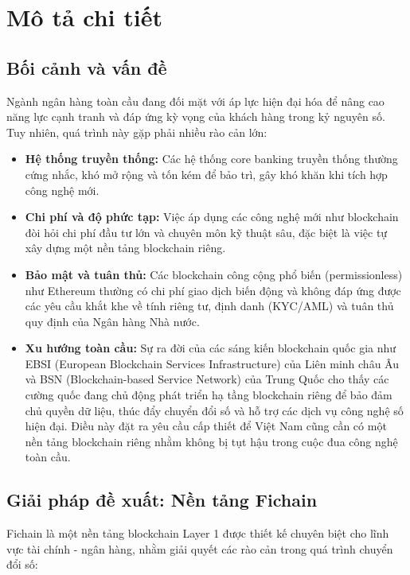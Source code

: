 \section{Mô tả chi tiết}

\subsection{Bối cảnh và vấn đề}
Ngành ngân hàng toàn cầu đang đối mặt với áp lực hiện đại hóa để nâng cao năng lực cạnh tranh và đáp ứng kỳ vọng của khách hàng trong kỷ nguyên số. Tuy nhiên, quá trình này gặp phải nhiều rào cản lớn:
\begin{itemize}
  \item \textbf{Hệ thống truyền thống:} Các hệ thống core banking truyền thống thường cứng nhắc, khó mở rộng và tốn kém để bảo trì, gây khó khăn khi tích hợp công nghệ mới.\cite{haralayya2021core}
  \item \textbf{Chi phí và độ phức tạp:} Việc áp dụng các công nghệ mới như blockchain đòi hỏi chi phí đầu tư lớn và chuyên môn kỹ thuật sâu, đặc biệt là việc tự xây dựng một nền tảng blockchain riêng.\cite{koteska2017blockchain}
  \item \textbf{Bảo mật và tuân thủ:} Các blockchain công cộng phổ biến (permissionless) như Ethereum thường có chi phí giao dịch biến động và không đáp ứng được các yêu cầu khắt khe về tính riêng tư\cite{peng2021privacy}, định danh (KYC/AML) và tuân thủ quy định của Ngân hàng Nhà nước.\cite{Vietnamese2023ND13,Vietnamese2022Luat14,Vietnamese2023ND19,Vietnamese2023TT09}
  \item \textbf{Xu hướng toàn cầu:} Sự ra đời của các sáng kiến blockchain quốc gia như EBSI (European Blockchain Services Infrastructure)\cite{ebsi2020} của Liên minh châu Âu và BSN (Blockchain-based Service Network)\cite{bsn2020} của Trung Quốc cho thấy các cường quốc đang chủ động phát triển hạ tầng blockchain riêng để bảo đảm chủ quyền dữ liệu, thúc đẩy chuyển đổi số và hỗ trợ các dịch vụ công nghệ số hiện đại. Điều này đặt ra yêu cầu cấp thiết để Việt Nam cũng cần có một nền tảng blockchain riêng nhằm không bị tụt hậu trong cuộc đua công nghệ toàn cầu.
\end{itemize}

\subsection{Giải pháp đề xuất: Nền tảng Fichain}
Fichain là một nền tảng blockchain Layer 1 được thiết kế chuyên biệt cho lĩnh vực tài chính - ngân hàng, nhằm giải quyết các rào cản trong quá trình chuyển đổi số:

